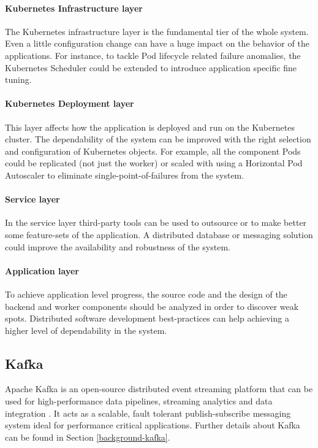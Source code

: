 \paragraph{Kubernetes Infrastructure layer} The Kubernetes infrastructure layer is the fundamental tier of the whole system. Even a little configuration change can have a huge impact on the behavior of the applications. For instance, to tackle Pod lifecycle related failure anomalies, the Kubernetes Scheduler could be extended to introduce application specific fine tuning.

\paragraph{Kubernetes Deployment layer} This layer affects how the application is deployed and run on the Kubernetes cluster. The dependability of the system can be improved with the right selection and configuration of Kubernetes objects. For example, all the component Pods could be replicated (not just the worker) or scaled with using a Horizontal Pod Autoscaler to eliminate single-point-of-failures from the system.

\paragraph{Service layer} In the service layer third-party tools can be used to outsource or to make better some feature-sets of the application. A distributed database or messaging solution could improve the availability and robustness of the system.

\paragraph{Application layer} To achieve application level progress, the source code and the design of the backend and worker components should be analyzed in order to discover weak spots. Distributed software development best-practices can help achieving a higher level of dependability in the system.

\subsection{Kafka}

Apache Kafka is an open-source distributed event streaming platform that can be used for high-performance data pipelines, streaming analytics and data integration \cite{Kafka}. It acts as a scalable, fault tolerant publish-subscribe messaging system ideal for performance critical applications. Further details about Kafka can be found in Section \ref{background-kafka}.

